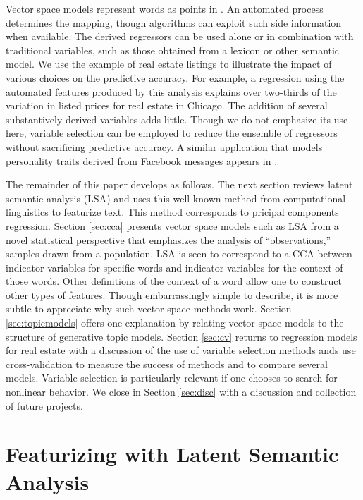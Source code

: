\documentclass[10pt]{article}
\begin{document}
 Vector space models represent words as points in \Rp.  An automated process
 determines the mapping, though algorithms can exploit such side information
 when available.  The derived regressors can be used alone or in combination
 with traditional variables, such as those obtained from a lexicon or other
 semantic model.  We use the example of real estate listings to illustrate the
 impact of various choices on the predictive accuracy.  For example, a
 regression using the automated features produced by this analysis explains over
 two-thirds of the variation in listed prices for real estate in Chicago.  The
 addition of several substantively derived variables adds little.  Though we do
 not emphasize its use here, variable selection can be employed to reduce the
 ensemble of regressors without sacrificing predictive accuracy.  A similar
 application that models personality traits derived from Facebook messages
 appears in \citet{ungar13}.


 The remainder of this paper develops as follows.  The next section reviews
 latent semantic analysis (LSA) and uses this well-known method from
 computational linguistics to featurize text.  This method corresponds to
 pricipal components regression.  Section \ref{sec:cca} presents vector space
 models such as LSA from a novel statistical perspective that emphasizes the
 analysis of ``observations,'' samples drawn from a population.  LSA is seen to
 correspond to a CCA between indicator variables for specific words and
 indicator variables for the context of those words.  Other definitions of the
 context of a word allow one to construct other types of features.  Though
 embarrassingly simple to describe, it is more subtle to appreciate why such
 vector space methods work.  Section \ref{sec:topicmodels} offers one
 explanation by relating vector space models to the structure of generative
 topic models.  Section \ref{sec:cv} returns to regression models for real
 estate with a discussion of the use of variable selection methods ands use
 cross-validation to measure the success of methods and to compare several
 models.  Variable selection is particularly relevant if one chooses to search
 for nonlinear behavior.  We close in Section \ref{sec:disc} with a discussion
 and collection of future projects.



\section{Featurizing with Latent Semantic Analysis}
\label{sec:lsa}
\end{document}
